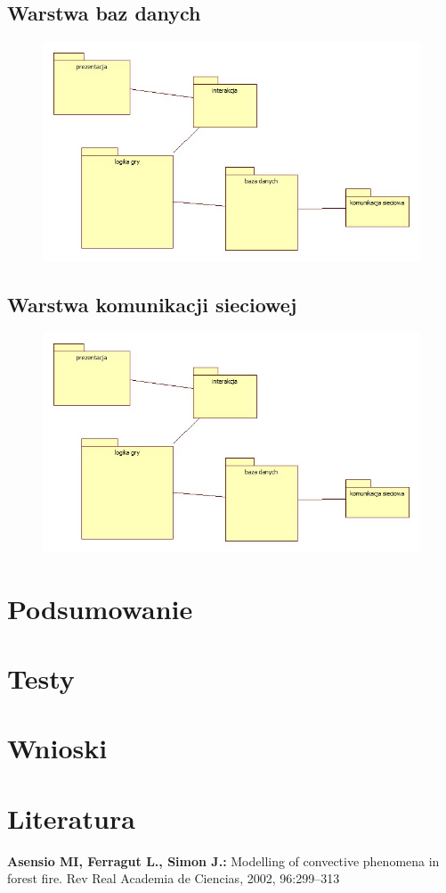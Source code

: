 \documentclass[a4paper, 11pt]{article}
\begin{document}
	\subsection{Warstwa baz danych}	
	\begin{figure}[H]%
		\includegraphics[scale=0.5]{uml/main.jpg}
	\end{figure}
	\subsection{Warstwa komunikacji sieciowej}
	\begin{figure}[H]%
		\includegraphics[scale=0.5]{uml/main.jpg}
	\end{figure}	
	
	
	
	\section{Podsumowanie}
	
	
	\section{Testy}
	
	
	\section{Wnioski}
	
	
	\section{Literatura}
	
	\textbf{Asensio MI, Ferragut L., Simon J.:} Modelling of convective phenomena in forest fire. Rev Real Academia de Ciencias, 2002, 96:299–313\\
	
	
\end{document}
